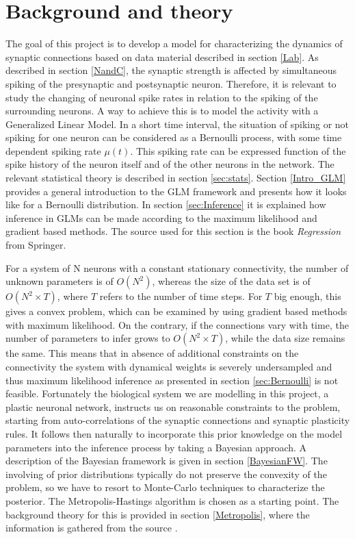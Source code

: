 
\chapter{Background and theory}
\label{ch:theory}

The goal of this project is to develop a model for characterizing the dynamics of synaptic connections based on data material described in section \ref{Lab}. As described in section \ref{NandC}, the synaptic strength is affected by simultaneous spiking of the presynaptic and postsynaptic neuron. Therefore, it is relevant to study the changing of neuronal spike rates in relation to the spiking of the surrounding neurons. A way to achieve this is to model the activity with a Generalized Linear Model. In a short time interval, the situation of spiking or not spiking for one neuron can be considered as a Bernoulli process, with some time dependent spiking rate $\mu (t)$. This spiking rate can be expressed function of the spike history of the neuron itself and of the other neurons in the network. The relevant statistical theory is described in section \ref{sec:stats}. Section \ref{Intro_GLM} provides a general introduction to the GLM framework and presents how it looks like for a Bernoulli distribution. In section \ref{sec:Inference} it is explained how inference in GLMs can be made according to the maximum likelihood and gradient based methods. The source used for this section is the book \textit{Regression} from Springer. 

For a system of N neurons with a constant stationary connectivity, the number of unknown parameters is of $O(N^2)$, whereas the size of the data set is of $O(N^2 \times T)$, where $T$ refers to the number of time steps. For $T$ big enough, this gives a convex problem, which can be examined by using gradient based methods with maximum likelihood. On the contrary, if the connections vary with time, the number of parameters to infer grows to $O(N^2 \times T)$, while the data size remains the same. This means that in absence of additional constraints on the connectivity the system with dynamical weights is severely undersampled and thus maximum likelihood inference as presented in section \ref{sec:Bernoulli} is not feasible. Fortunately the biological system we are modelling in this project, a plastic neuronal network, instructs us on reasonable constraints to the problem, starting from auto-correlations of the synaptic connections and synaptic plasticity rules. It follows then naturally to incorporate this prior knowledge on the model parameters into the inference process by taking a Bayesian approach. A description of the Bayesian framework is given in section \ref{BayesianFW}. The involving of prior distributions typically do not preserve the convexity of the problem, so we have to resort to Monte-Carlo techniques to characterize the posterior. The Metropolis-Hastings algorithm is chosen as a starting point. The background theory for this is provided in section \ref{Metropolis}, where the information is gathered from the source \cite{MC}.

